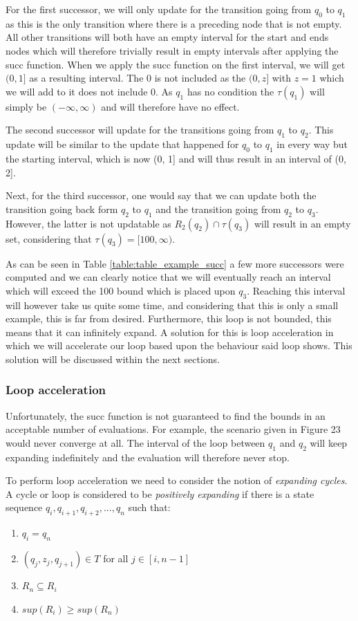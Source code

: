 \documentclass[12pt]{article}
\begin{document}
For the first successor, we will only update for the transition going from $q_0$ to $q_1$ as this is the only transition where there is a preceding node that is not empty. All other transitions will both have an empty interval for the start and ends nodes which will therefore trivially result in empty intervals after applying the succ function. When we apply the succ function on the first interval, we will get $(0, 1]$ as a resulting interval. The 0 is not included as the $(0,z]$ with $z=1$ which we will add to it does not include 0. As $q_1$ has no condition the $\tau(q_1)$ will simply be $(-\infty, \infty)$ and will therefore have no effect.

The second successor will update for the transitions going from $q_1$ to $q_2$. This update will be similar to the update that happened for $q_0$ to $q_1$ in every way but the starting interval, which is now (0, 1] and will thus result in an interval of (0, 2].

Next, for the third successor, one would say that we can update both the transition going back form $q_2$ to $q_1$ and the transition going from $q_2$ to $q_3$. However, the latter is not updatable as $R_2(q_2) \cap \tau(q_3)$ will result in an empty set, considering that $\tau(q_3) = [100, \infty)$.

As can be seen in Table \ref{table:table_example_succ} a few more successors were computed and we can clearly notice that we will eventually reach an interval which will exceed the 100 bound which is placed upon $q_3$. Reaching this interval will however take us quite some time, and considering that this is only a small example, this is far from desired. Furthermore, this loop is not bounded, this means that it can infinitely expand. A solution for this is loop acceleration in which we will accelerate our loop based upon the behaviour said loop shows. This solution will be discussed within the next sections.

\subsubsection{Loop acceleration}

Unfortunately, the succ function is not guaranteed to find the bounds in an acceptable number of evaluations. For example, the scenario given in Figure 23 would never converge at all. The interval of the loop between $q_1$ and $q_2$ will keep expanding indefinitely and the evaluation will therefore never stop.

To perform loop acceleration we need to consider the notion of \textit{expanding cycles}. A cycle or loop is considered to be \textit{positively expanding} if there is a state sequence $q_i, q_{i+1}, q_{i+2}, ..., q_n$ such that:
\begin{enumerate}
	\item $q_i = q_n$
	\item $(q_j, z_j, q_{j+1}) \in T$ for all $j \in [i, n-1]$
	\item $R_n \subseteq R_i$
	\item $sup(R_i) \geq sup(R_n)$
\end{enumerate}
\end{document}
